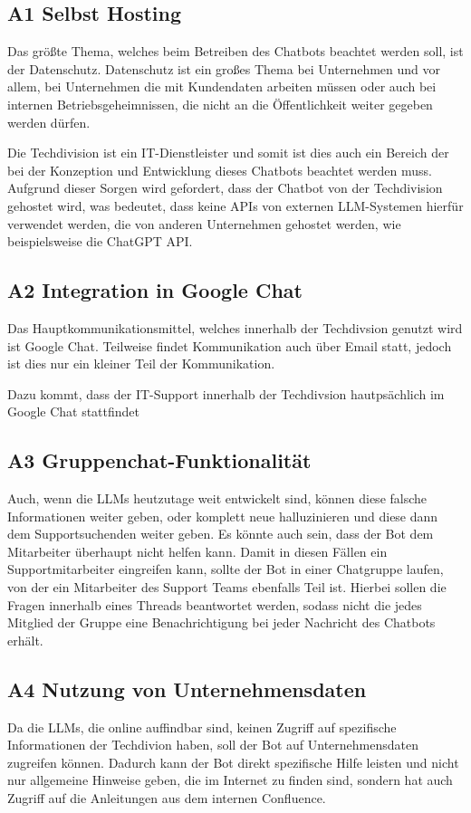\subsection{A1 Selbst Hosting}
\label{s:anf:a1}
Das größte Thema, welches beim Betreiben des Chatbots beachtet werden soll, ist der
Datenschutz. Datenschutz ist ein großes Thema bei Unternehmen und vor allem, bei 
Unternehmen die mit Kundendaten arbeiten müssen oder auch bei internen Betriebsgeheimnissen,
die nicht an die Öffentlichkeit weiter gegeben werden dürfen. \par
Die Techdivision ist ein IT-Dienstleister und somit ist dies auch ein
Bereich der bei der Konzeption und Entwicklung dieses Chatbots beachtet werden 
muss. Aufgrund dieser Sorgen wird gefordert, dass der Chatbot von der 
Techdivision gehostet wird, was bedeutet, dass keine APIs von externen LLM-Systemen 
hierfür verwendet
werden, die von anderen Unternehmen gehostet werden, wie beispielsweise
die ChatGPT API.
\subsection{A2 Integration in Google Chat}
\label{s:anf:a2}
Das Hauptkommunikationsmittel, welches innerhalb der Techdivsion
genutzt wird ist Google Chat. Teilweise findet Kommunikation
auch über Email statt, jedoch ist dies nur ein kleiner Teil der Kommunikation.\par
Dazu kommt, dass der IT-Support innerhalb der Techdivsion 
hautpsächlich im Google Chat stattfindet
\subsection{A3 Gruppenchat-Funktionalität}
\label{s:anf:a3}
Auch, wenn die LLMs heutzutage weit entwickelt sind, können diese 
falsche Informationen weiter geben, oder komplett neue halluzinieren
und diese dann dem Supportsuchenden weiter geben. Es könnte auch sein, dass
der Bot dem Mitarbeiter überhaupt nicht helfen kann. Damit in diesen Fällen
ein Supportmitarbeiter eingreifen kann, sollte der Bot in einer Chatgruppe 
laufen, von der ein Mitarbeiter des Support Teams ebenfalls Teil ist. Hierbei 
sollen die Fragen innerhalb eines Threads beantwortet werden, sodass nicht die 
jedes Mitglied der Gruppe eine Benachrichtigung bei jeder Nachricht des Chatbots erhält.\par
\subsection{A4 Nutzung von Unternehmensdaten}
\label{s:anf:a4}
Da die LLMs, die online auffindbar sind, keinen Zugriff auf spezifische Informationen 
der Techdivion haben, soll der Bot auf Unternehmensdaten 
zugreifen können. Dadurch kann der Bot direkt spezifische Hilfe leisten und 
nicht nur allgemeine Hinweise geben, die im Internet zu finden sind, sondern
hat auch Zugriff auf die Anleitungen aus dem internen Confluence.
